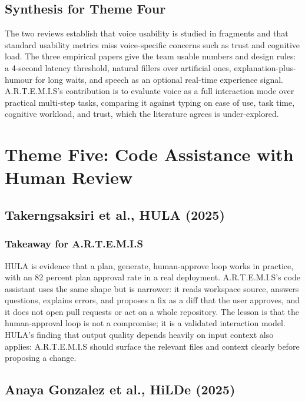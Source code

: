 \documentclass[11pt,a4paper]{report}
\newcommand{\artemis}{A.R.T.E.M.I.S}
\begin{document}
\subsection{Synthesis for Theme Four}

The two reviews establish that voice usability is studied in fragments
and that standard usability metrics miss voice-specific concerns such as
trust and cognitive load. The three empirical papers give the team
usable numbers and design rules: a 4-second latency threshold, natural
fillers over artificial ones, explanation-plus-humour for long waits,
and speech as an optional real-time experience signal. \artemis{}'s
contribution is to evaluate voice as a full interaction mode over
practical multi-step tasks, comparing it against typing on ease of use,
task time, cognitive workload, and trust, which the literature agrees is
under-explored.

\section{Theme Five: Code Assistance with Human Review}

\subsection{Takerngsaksiri et al., HULA (2025)}

\subsubsection{Takeaway for \artemis{}}

HULA is evidence that a plan, generate, human-approve loop works in
practice, with an 82 percent plan approval rate in a real deployment.
\artemis{}'s code assistant uses the same shape but is narrower: it
reads workspace source, answers questions, explains errors, and
proposes a fix as a diff that the user approves, and it does not open
pull requests or act on a whole repository. The lesson is that the
human-approval loop is not a compromise; it is a validated interaction
model. HULA's finding that output quality depends heavily on input
context also applies: \artemis{} should surface the relevant files and
context clearly before proposing a change.

\subsection{Anaya Gonzalez et al., HiLDe (2025)}
\end{document}
